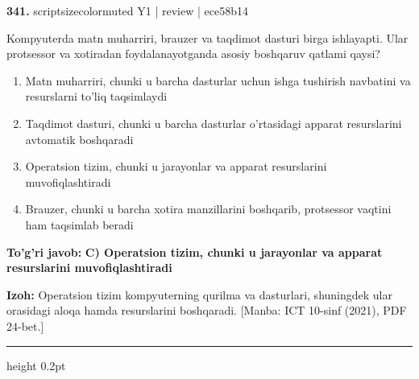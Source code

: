 \documentclass[10pt,a4paper]{article}
\begin{document}
{\bfseries\sffamily\color{ink} 341.} {scriptsizecolor{muted} Y1 | review | ece58b14}
\par
Kompyuterda matn muharriri, brauzer va taqdimot dasturi birga ishlayapti. Ular protsessor va xotiradan foydalanayotganda asosiy boshqaruv qatlami qaysi?
\begin{enumerate}[label=\Alph*),leftmargin=9mm]
\item Matn muharriri, chunki u barcha dasturlar uchun ishga tushirish navbatini va resurslarni to'liq taqsimlaydi
\item Taqdimot dasturi, chunki u barcha dasturlar o'rtasidagi apparat resurslarini avtomatik boshqaradi
\item Operatsion tizim, chunki u jarayonlar va apparat resurslarini muvofiqlashtiradi
\item Brauzer, chunki u barcha xotira manzillarini boshqarib, protsessor vaqtini ham taqsimlab beradi
\end{enumerate}
\begin{tcolorbox}[enhanced,breakable,colback=teal!4,colframe=teal!60!black,boxrule=0.45pt,arc=1.2mm,left=2.7mm,right=2.7mm,top=1.8mm,bottom=1.8mm,before skip=2mm,after skip=2mm]
{\bfseries\sffamily\color{teal}To'g'ri javob:} \textbf{C) Operatsion tizim, chunki u jarayonlar va apparat resurslarini muvofiqlashtiradi}
\par\smallskip
{\bfseries Izoh:} Operatsion tizim kompyuterning qurilma va dasturlari, shuningdek ular orasidagi aloqa hamda resurslarini boshqaradi. [Manba: ICT 10-sinf (2021), PDF 24-bet.]
\end{tcolorbox}
\vspace{2mm}\hrule height 0.2pt\vspace{3mm}
\end{document}
